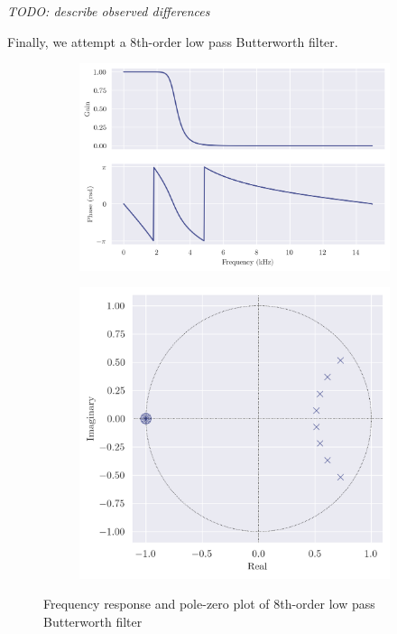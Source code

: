 \textit{TODO: describe observed differences}

\newpage

Finally, we attempt a 8th-order low pass Butterworth filter.

\begin{figure}[ht]
    \centering
    \begin{subfigure}[b]{0.58\textwidth}
        \centering
        \includegraphics[width=\textwidth]{images/q8_8th_freqz.png}
    \end{subfigure}
    \hfill
    \begin{subfigure}[b]{0.41\textwidth}
        \centering
        \includegraphics[width=\textwidth]{images/q8_8th_zp.png}
    \end{subfigure}
    \caption{Frequency response and pole-zero plot of 8th-order low pass Butterworth filter}
\end{figure}

